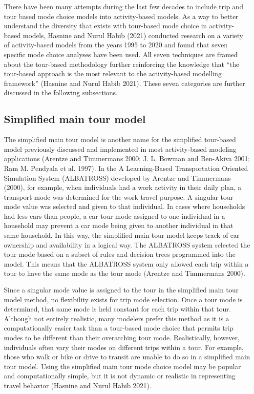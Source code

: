 \documentclass[12pt, oneside, openright]{byuthesis}
\begin{document}
There have been many attempts during the last few decades to include trip and tour based mode choice models into activity-based models. As a way to better understand the diversity that exists with tour-based mode choice in activity-based models, Hasnine and Nurul Habib (2021) conducted research on a variety of activity-based models from the years 1995 to 2020 and found that seven specific mode choice analyses have been used. All seven techniques are framed about the tour-based methodology further reinforcing the knowledge that ``the tour-based approach is the most relevant to the activity-based modelling framework'' (Hasnine and Nurul Habib 2021). These seven categories are further discussed in the following subsections.

\hypertarget{lit31}{%
\subsection{Simplified main tour model}\label{lit31}}

The simplified main tour model is another name for the simplified tour-based model previously discussed and implemented in most activity-based modeling applications (Arentze and Timmermans 2000; J. L. Bowman and Ben-Akiva 2001; Ram M. Pendyala et al. 1997). In the A Learning-Based Transportation Oriented Simulation System (ALBATROSS) developed by Arentze and Timmermans (2000), for example, when individuals had a work activity in their daily plan, a transport mode was determined for the work travel purpose. A singular tour mode value was selected and given to that individual. In cases where households had less cars than people, a car tour mode assigned to one individual in a household may prevent a car mode being given to another individual in that same household. In this way, the simplified main tour model keeps track of car ownership and availability in a logical way. The ALBATROSS system selected the tour mode based on a subset of rules and decision trees programmed into the model. This means that the ALBATROSS system only allowed each trip within a tour to have the same mode as the tour mode (Arentze and Timmermans 2000).

Since a singular mode value is assigned to the tour in the simplified main tour model method, no flexibility exists for trip mode selection. Once a tour mode is determined, that same mode is held constant for each trip within that tour. Although not entirely realistic, many modelers prefer this method as it is a computationally easier task than a tour-based mode choice that permits trip modes to be different than their overarching tour mode. Realistically, however, individuals often vary their modes on different trips within a tour. For example, those who walk or bike or drive to transit are unable to do so in a simplified main tour model. Using the simplified main tour mode choice model may be popular and computationally simple, but it is not dynamic or realistic in representing travel behavior (Hasnine and Nurul Habib 2021).
\end{document}
